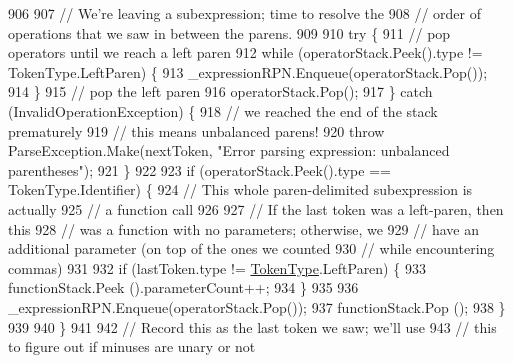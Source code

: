 \begin{DoxyCode}
906 
907                         \textcolor{comment}{// We're leaving a subexpression; time to resolve the}
908                         \textcolor{comment}{// order of operations that we saw in between the parens.}
909 
910                         \textcolor{keywordflow}{try} \{
911                             \textcolor{comment}{// pop operators until we reach a left paren}
912                             \textcolor{keywordflow}{while} (operatorStack.Peek().type != TokenType.LeftParen) \{
913                                 \_expressionRPN.Enqueue(operatorStack.Pop());
914                             \}
915                             \textcolor{comment}{// pop the left paren}
916                             operatorStack.Pop();
917                         \} \textcolor{keywordflow}{catch} (InvalidOperationException) \{
918                             \textcolor{comment}{// we reached the end of the stack prematurely}
919                             \textcolor{comment}{// this means unbalanced parens!}
920                             \textcolor{keywordflow}{throw} ParseException.Make(nextToken, \textcolor{stringliteral}{"Error parsing expression: unbalanced
       parentheses"});
921                         \}
922 
923                         \textcolor{keywordflow}{if} (operatorStack.Peek().type == TokenType.Identifier) \{
924                             \textcolor{comment}{// This whole paren-delimited subexpression is actually}
925                             \textcolor{comment}{// a function call}
926 
927                             \textcolor{comment}{// If the last token was a left-paren, then this}
928                             \textcolor{comment}{// was a function with no parameters; otherwise, we}
929                             \textcolor{comment}{// have an additional parameter (on top of the ones we counted}
930                             \textcolor{comment}{// while encountering commas)}
931 
932                             \textcolor{keywordflow}{if} (lastToken.type != \hyperlink{a00053_a301aa7c866593a5b625a8fc158bbeace}{TokenType}.LeftParen) \{
933                                 functionStack.Peek ().parameterCount++;
934                             \}
935 
936                             \_expressionRPN.Enqueue(operatorStack.Pop());
937                             functionStack.Pop ();
938                         \}
939 
940                     \}
941 
942                     \textcolor{comment}{// Record this as the last token we saw; we'll use}
943                     \textcolor{comment}{// this to figure out if minuses are unary or not}

\end{DoxyCode}
